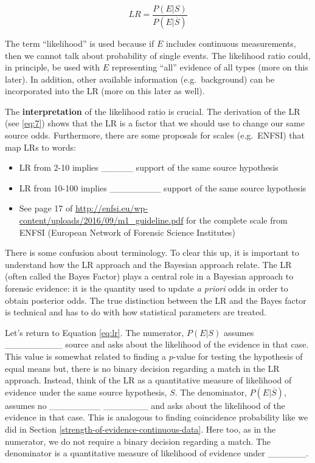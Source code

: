 \documentclass[]{book}
\providecommand{\tightlist}{%
  \setlength{\itemsep}{0pt}\setlength{\parskip}{0pt}}
\theoremstyle{definition}
\theoremstyle{definition}
\theoremstyle{remark}
\begin{document}
\begin{equation}\label{eq:lr}
LR = \frac{P(E|S)}{P(E|\overline{S})}
\end{equation}

The term ``likelihood'' is used because if \(E\) includes continuous
measurements, then we cannot talk about probability of single events.
The likelihood ratio could, in principle, be used with \(E\)
representing ``all'' evidence of all types (more on this later). In
addition, other available information (e.g.~background) can be
incorporated into the LR (more on this later as well).

The \textbf{interpretation} of the likelihood ratio is crucial. The
derivation of the LR (see \ref{eq:7}) shows that the LR is a factor that
we should use to change our same source odds. Furthermore, there are
some proposals for scales (e.g.~ENFSI) that map LRs to words:

\begin{itemize}
\tightlist
\item
  LR from 2-10 implies \_\_\_\_\_ support of the same source
  hypothesis\vspace{.1in}
\item
  LR from 10-100 implies \_\_\_\_\_\_\_\_ support of the same source
  hypothesis\vspace{.1in}
\item
  See page 17 of
  \url{http://enfsi.eu/wp-content/uploads/2016/09/m1_guideline.pdf} for
  the complete scale from ENFSI (European Network of Forensic Science
  Institutes)
\end{itemize}

There is some confusion about terminology. To clear this up, it is
important to understand how the LR approach and the Bayesian approach
relate. The LR (often called the Bayes Factor) plays a central role in a
Bayesian approach to forensic evidence: it is the quantity used to
update \emph{a priori} odds in order to obtain posterior odds. The true
distinction between the LR and the Bayes factor is technical and has to
do with how statistical parameters are treated.

Let's return to Equation \ref{eq:lr}. The numerator, \(P(E|S)\) assumes
\_\_\_\_\_\_\_\_\_ source and asks about the likelihood of the evidence
in that case. This value is somewhat related to finding a \(p\)-value
for testing the hypothesis of equal means but, there is no binary
decision regarding a match in the LR approach. Instead, think of the LR
as a quantitative measure of likelihood of evidence under the same
source hypothesis, \(S\). The denominator, \(P(E|\overline{S})\),
assumes no \_\_\_\_\_\_\_\_ \_\_\_\_\_\_\_ and asks about the likelihood
of the evidence in that case. This is analogous to finding coincidence
probability like we did in Section
\ref{strength-of-evidence-continuous-data}. Here too, as in the
numerator, we do not require a binary decision regarding a match. The
denominator is a quantitative measure of likelihood of evidence under
\_\_\_\_\_\_.
\end{document}

